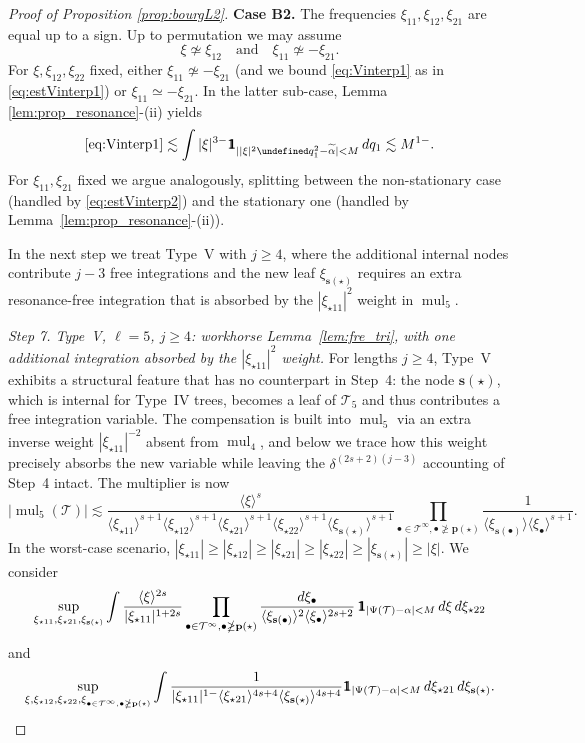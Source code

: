 \documentclass[a4paper,
11pt,  reqno]{amsart}
\newcommand{\mathbbm}[1]{\mathchoice%
    {\hbox{\sffamily 1\kern-.40em 1}}%
    {\hbox{\sffamily 1\kern-.40em 1}}%
    {\hbox{\scriptsize\sffamily 1\kern-.30em 1}}%
    {\hbox{\tiny\sffamily 1\kern-.25em 1}}}%
\newcommand{\jap}[1]{\langle #1 \rangle}
\newcommand{\5}{\textup{V}}
\newcommand{\noi}{\noindent}
\newcommand{\ind}{\mathbbm 1}
\theoremstyle{remark}
\newcommand{\bul}{\bullet}
\let\Re=\undefined\DeclareMathOperator*{\Re}{Re}
\newcommand{\TT}{\mathcal{T}}
\newcommand{\pb}{\mathbf{p}}
\newcommand{\sbf}{\mathbf{s}}
\DeclareMathOperator{\mul}{mul}
\numberwithin{equation}{section}
\numberwithin{theorem}{section}
\begin{document}
\begin{proof}[Proof of Proposition \ref{prop:bourgL2}]
\smallskip
\noi\textbf{Case B2.} The frequencies $\xi_{11}, \xi_{12}, \xi_{21}$ are equal up to a sign. Up to permutation we may assume
$$
\xi \not\simeq \xi_{12} \quad \mbox{and}\quad \xi_{11}\not\simeq -\xi_{21}.
$$
For $\xi, \xi_{12}, \xi_{22}$ fixed, either $\xi_{11} \not\simeq -\xi_{21}$ (and we bound \eqref{eq:Vinterp1} as in \eqref{eq:estVinterp1}) or $\xi_{11}\simeq -\xi_{21}$. In the latter sub-case, Lemma \ref{lem:prop_resonance}-(ii) yields
\begin{equation}
\eqref{eq:Vinterp1} \lesssim \int |\xi|^{3-}\ind_{||\xi|^2\Re q_1^2 - \widetilde\alpha|<M} \,dq_1 \lesssim M^{1-}.
\end{equation}
For $\xi_{11}, \xi_{21}$ fixed we argue analogously, splitting between the non-stationary case (handled by \eqref{eq:estVinterp2}) and the stationary one (handled by Lemma~\ref{lem:prop_resonance}-(ii)).

In the next step we treat Type~V with $j\ge 4$, where the additional internal nodes contribute $j-3$ free integrations and the new leaf $\xi_{\sbf(\star)}$ requires an extra resonance-free integration that is absorbed by the $|\xi_{\star11}|^{2}$ weight in $\mul_5$.

\medskip
\noi\textit{Step 7. Type~V, $\ell=5$, $j\ge 4$: workhorse Lemma~\ref{lem:fre_tri}, with one additional integration absorbed by the $|\xi_{\star 1 1}|^{2}$ weight.}
For lengths $j\ge 4$, Type~V exhibits a structural feature that has no counterpart in Step~4: the node $\sbf(\star)$, which is internal for Type~IV trees, becomes a leaf of $\TT_5$ and thus contributes a free integration variable. The compensation is built into $\mul_5$ via an extra inverse weight $|\xi_{\star 11}|^{-2}$ absent from $\mul_4$, and below we trace how this weight precisely absorbs the new variable while leaving the $\delta^{(2s+2)(j-3)}$ accounting of Step~4 intact.
The multiplier is now
\begin{equation}\label{eq:mul5_high_j}
|\mul_5(\TT)| \lesssim \frac{\jap{\xi}^s}{\jap{\xi_{\star11}}^{s+1}\jap{\xi_{\star12}}^{s+1}\jap{\xi_{\star21}}^{s+1}\jap{\xi_{\star22}}^{s+1}\jap{\xi_{\sbf(\star)}}^{s+1}} \prod_{\bul \in \TT^\infty, \bul\ngeq \pb(\star)} \frac{1}{\jap{\xi_{\sbf(\bul)}}\jap{\xi_\bul}^{s+1}}.
\end{equation}
In the worst-case scenario, $|\xi_{\star11}|\ge|\xi_{\star12}|\ge|\xi_{\star21}|\ge|\xi_{\star22}|\ge|\xi_{\sbf(\star)}|\ge |\xi|$. We consider
\begin{equation}\label{eq:Vinterp3}
\sup_{\xi_{\star11}, \xi_{\star21}, \xi_{\sbf(\star)}} \int \frac{\jap{\xi}^{2s}}{|\xi_{\star11}|^{1+2s}}\prod_{\bul \in \TT^\infty, \bul\ngeq \pb(\star)} \frac{d\xi_\bul}{\jap{\xi_{\sbf(\bul)}}^2\jap{\xi_\bul}^{2s+2}}\,\ind_{|\Psi(\TT)-\alpha|<M}\,d\xi\, d\xi_{\star22}
\end{equation}
and
\begin{equation}\label{eq:Vinterp4}
\sup_{\xi, \xi_{\star12}, \xi_{\star22}, \xi_{\bul \in \TT^\infty, \bul\ngeq \pb(\star)}} \int \frac{1}{|\xi_{\star11}|^{1-}\jap{\xi_{\star21}}^{4s+4}\jap{\xi_{\sbf(\star)}}^{4s+4}} \ind_{|\Psi(\TT)-\alpha|<M}\, d\xi_{\star21}\,d\xi_{\sbf(\star)}.
\end{equation}


\end{proof}
\end{document}
